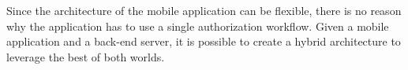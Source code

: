 Since the architecture of the mobile application can be flexible, there is no reason why the application has to use a single authorization workflow. Given a mobile application and a back-end server, it is possible to create a hybrid architecture to leverage the best of both worlds.

